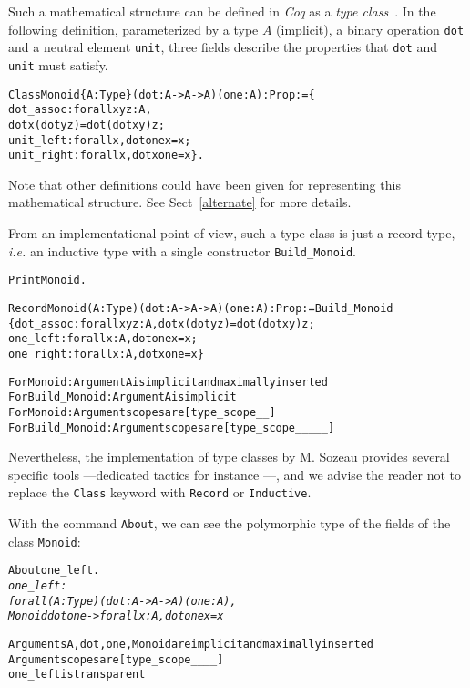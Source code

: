 \documentclass[a4]{report}
\newcommand{\coq}{\mbox{\emph{Coq}}}
\begin{document}
Such a mathematical structure can be defined in {\coq} as
a \emph{type class}~\citep{DBLP:conf/tphol/SozeauO08, math-classes, DBLP:journals/corr/abs-1106-3448}. In the following definition, parameterized by
a type $A$ (implicit), a binary operation \texttt{dot} and a neutral element 
\texttt{unit}, three fields describe the properties that \texttt{dot} and
\texttt{unit} must satisfy.


\begin{alltt}
Class Monoid \{A:Type\}(dot : A -> A -> A)(one : A) : Prop := \{
 dot_assoc : forall x y z:A, 
     dot x (dot y z) = dot (dot x y) z;
 unit_left : forall x, dot one x = x;
 unit_right : forall x, dot x one = x \}.
\end{alltt}


Note that other definitions could have been given for representing this mathematical structure. See Sect~\ref{alternate} for more details.


From an implementational point of view, such a type class is just a record type,
\emph{i.e.} an inductive type with a single constructor \texttt{Build\_Monoid}.

\begin{alltt}
Print Monoid.\it\color{red}

Record Monoid (A : Type) (dot : A -> A -> A) (one : A) : Prop := Build_Monoid
  \{ dot_assoc : forall x y z : A, dot x (dot y z) = dot (dot x y) z;
    one_left : forall x : A, dot one x = x;
    one_right : forall x : A, dot x one = x \}

For Monoid: Argument A is implicit and maximally inserted
For Build_Monoid: Argument A is implicit
For Monoid: Argument scopes are [type_scope _ _]
For Build_Monoid: Argument scopes are [type_scope _ _ _ _ _]
\end{alltt}
\label{ClassVsRecords}
Nevertheless, the implementation of type classes by M. Sozeau provides several specific tools 
---dedicated tactics for instance ---, and we advise the reader not to replace
the \texttt{Class} keyword with \texttt{Record} or \texttt{Inductive}.


With the command \texttt{About}, we can see the polymorphic type of
the fields of the class \texttt{Monoid}:

\begin{alltt}
About one_left.\it\color{red}
one_left :
forall (A : Type) (dot : A -> A -> A) (one : A),
Monoid dot one -> forall x : A, dot one x = x

Arguments A, dot, one, Monoid are implicit and maximally inserted
Argument scopes are [type_scope _ _ _ _]
one_left is transparent  
\end{alltt}
\end{document}
